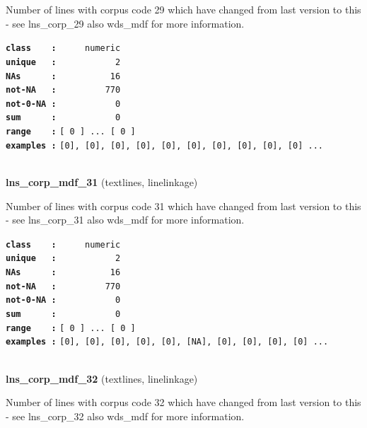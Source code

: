 \documentclass[]{article}
\begin{document}
Number of lines with corpus code 29 which have changed from last version
to this - see lns\_corp\_29 also wds\_mdf for more information.

\textbf{\texttt{class\ \ \ \ :}} \texttt{~~~~~numeric}\\
\textbf{\texttt{unique\ \ \ :}} \texttt{~~~~~~~~~~~2}\\
\textbf{\texttt{NAs\ \ \ \ \ \ :}} \texttt{~~~~~~~~~~16}\\
\textbf{\texttt{not-NA\ \ \ :}} \texttt{~~~~~~~~~770}\\
\textbf{\texttt{not-0-NA\ :}} \texttt{~~~~~~~~~~~0}\\
\textbf{\texttt{sum\ \ \ \ \ \ :}} \texttt{~~~~~~~~~~~0}\\
\textbf{\texttt{range\ \ \ \ :}}
\texttt{{[}\ 0\ {]}\ ...\ {[}\ 0\ {]}}\\
\textbf{\texttt{examples\ :}}
\texttt{{[}0{]},\ {[}0{]},\ {[}0{]},\ {[}0{]},\ {[}0{]},\ {[}0{]},\ {[}0{]},\ {[}0{]},\ {[}0{]},\ {[}0{]}\ ...}\\

~

\textbf{lns\_corp\_mdf\_31} (textlines, linelinkage)

Number of lines with corpus code 31 which have changed from last version
to this - see lns\_corp\_31 also wds\_mdf for more information.

\textbf{\texttt{class\ \ \ \ :}} \texttt{~~~~~numeric}\\
\textbf{\texttt{unique\ \ \ :}} \texttt{~~~~~~~~~~~2}\\
\textbf{\texttt{NAs\ \ \ \ \ \ :}} \texttt{~~~~~~~~~~16}\\
\textbf{\texttt{not-NA\ \ \ :}} \texttt{~~~~~~~~~770}\\
\textbf{\texttt{not-0-NA\ :}} \texttt{~~~~~~~~~~~0}\\
\textbf{\texttt{sum\ \ \ \ \ \ :}} \texttt{~~~~~~~~~~~0}\\
\textbf{\texttt{range\ \ \ \ :}}
\texttt{{[}\ 0\ {]}\ ...\ {[}\ 0\ {]}}\\
\textbf{\texttt{examples\ :}}
\texttt{{[}0{]},\ {[}0{]},\ {[}0{]},\ {[}0{]},\ {[}0{]},\ {[}NA{]},\ {[}0{]},\ {[}0{]},\ {[}0{]},\ {[}0{]}\ ...}\\

~

\textbf{lns\_corp\_mdf\_32} (textlines, linelinkage)

Number of lines with corpus code 32 which have changed from last version
to this - see lns\_corp\_32 also wds\_mdf for more information.
\end{document}
